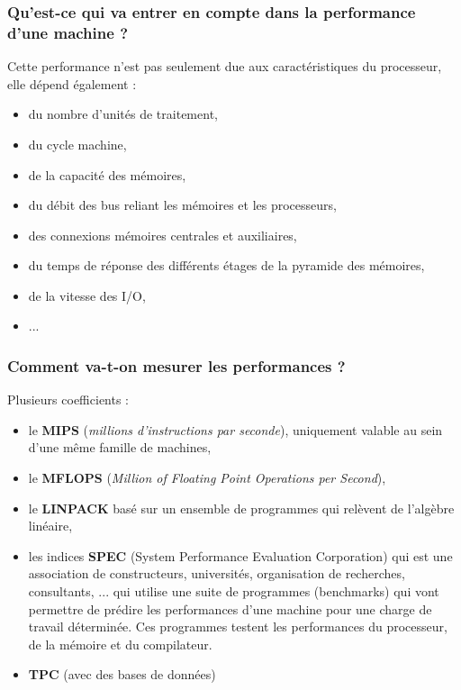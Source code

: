 \documentclass[10pt,a4paper,oneside,titlepage]{report}
\begin{document}
\begin{sffamily}
\subsubsection{Qu'est-ce qui va entrer en compte dans la performance d'une machine ?}

Cette performance n'est pas seulement due aux caractéristiques du processeur, elle dépend également :
\begin{itemize}
\item du nombre d'unités de traitement,
\item du cycle machine,
\item de la capacité des mémoires,
\item du débit des bus reliant les mémoires et les processeurs,
\item des connexions mémoires centrales et auxiliaires,
\item du temps de réponse des différents étages de la pyramide des mémoires,
\item de la vitesse des I/O,
\item ...
\end{itemize}

\subsubsection{Comment va-t-on mesurer les performances ?}

Plusieurs coefficients : \begin{itemize}
\item le \textbf{MIPS} (\textit{millions d'instructions par seconde}), uniquement valable au sein d'une m\^eme famille de machines,
\item le \textbf{MFLOPS} (\textit{Million of Floating Point Operations per Second}),
\item le \textbf{LINPACK} basé sur un ensemble de programmes qui relèvent de l'algèbre linéaire,
\item les indices \textbf{SPEC} (System Performance Evaluation Corporation) qui est une association de constructeurs, universités, organisation de recherches, consultants, ... qui utilise une suite de programmes (benchmarks) qui vont permettre de 
prédire les performances d'une machine pour une charge de travail déterminée. Ces programmes testent les performances du processeur, de la mémoire et du compilateur.
\item \textbf{TPC} (avec des bases de données)
\end{itemize}


\end{sffamily}
\end{document}
